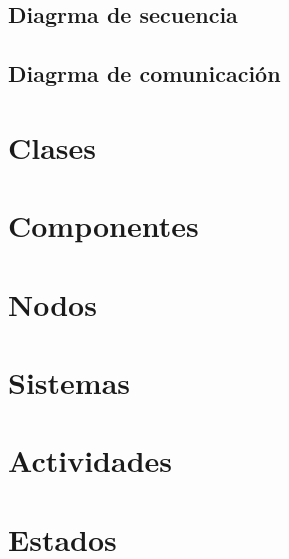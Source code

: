 \subsection{Diagrma de secuencia}

\subsection{Diagrma de comunicación}

\newpage

\section{Clases}

\newpage

\section{Componentes}

\newpage

\section{Nodos}

\newpage

\section{Sistemas}

\newpage

\section{Actividades}

\newpage

\section{Estados}

\newpage






